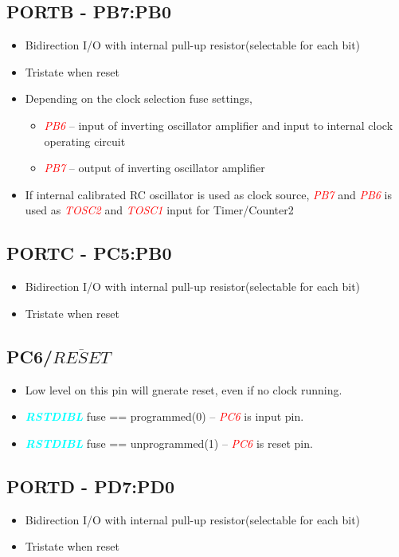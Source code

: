 \documentclass{article}
\newcommand{\bitFormat}[1]{\emph{\textbf{\textcolor{cyan}{#1}}}}
\newcommand{\pinFormat}[1]{\emph{\textcolor{red}{#1}}}
\begin{document}
\subsection{PORTB - PB7:PB0}
\begin{itemize}
    \item Bidirection I/O with internal pull-up resistor(selectable for each bit)
    \item Tristate when reset
    \item Depending on the clock selection fuse settings,
    \begin{itemize}
        \item \pinFormat{PB6} – input of inverting oscillator amplifier and input to internal clock operating circuit
        \item \pinFormat{PB7} – output of inverting oscillator amplifier
    \end{itemize}
    \item If internal calibrated RC oscillator is used as clock source, \pinFormat{PB7} and \pinFormat{PB6} is used as \pinFormat{TOSC2} and \pinFormat{TOSC1} input for Timer/Counter2
\end{itemize}

\subsection{PORTC - PC5:PB0}
\begin{itemize}
    \item Bidirection I/O with internal pull-up resistor(selectable for each bit)
    \item Tristate when reset
\end{itemize}

\subsection{PC6/\texorpdfstring{$\overline{RESET}$}{}}
\begin{itemize}
    \item Low level on this pin will gnerate reset, even if no clock running.
    \item \bitFormat{RSTDIBL} fuse == programmed(0) -- \pinFormat{PC6} is input pin.
    \item \bitFormat{RSTDIBL} fuse == unprogrammed(1) -- \pinFormat{PC6} is reset pin.
\end{itemize}

\subsection{PORTD - PD7:PD0}
\begin{itemize}
    \item Bidirection I/O with internal pull-up resistor(selectable for each bit)
    \item Tristate when reset
\end{itemize}
\end{document}
